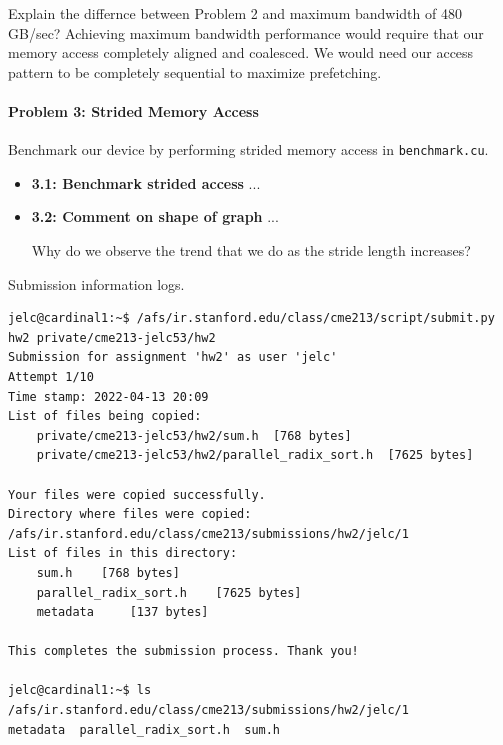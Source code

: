 \documentclass[12pt,letterpaper,twoside]{article}
\begin{document}
\begin{itemize}
    Explain the differnce between Problem 2 and maximum bandwidth of 480 GB/sec? 
    Achieving maximum bandwidth performance would require that our memory access
    completely aligned and coalesced. We would need our access pattern to 
    be completely sequential to maximize prefetching.

\end{itemize}


\paragraph{Problem 3: Strided Memory Access} Benchmark our device by performing
strided memory access in \texttt{benchmark.cu}.


\begin{itemize}
    \item \textbf{3.1: Benchmark strided access} ...

    \item \textbf{3.2: Comment on shape of graph} ...

    Why do we observe the trend that we do as the stride length increases?

\end{itemize}


Submission information logs.
\begin{verbatim}
jelc@cardinal1:~$ /afs/ir.stanford.edu/class/cme213/script/submit.py hw2 private/cme213-jelc53/hw2
Submission for assignment 'hw2' as user 'jelc'
Attempt 1/10
Time stamp: 2022-04-13 20:09
List of files being copied:
    private/cme213-jelc53/hw2/sum.h	 [768 bytes]
    private/cme213-jelc53/hw2/parallel_radix_sort.h	 [7625 bytes]

Your files were copied successfully.
Directory where files were copied: /afs/ir.stanford.edu/class/cme213/submissions/hw2/jelc/1
List of files in this directory:
    sum.h	 [768 bytes]
    parallel_radix_sort.h	 [7625 bytes]
    metadata	 [137 bytes]

This completes the submission process. Thank you!

jelc@cardinal1:~$ ls /afs/ir.stanford.edu/class/cme213/submissions/hw2/jelc/1
metadata  parallel_radix_sort.h  sum.h
\end{verbatim}
\end{document}
